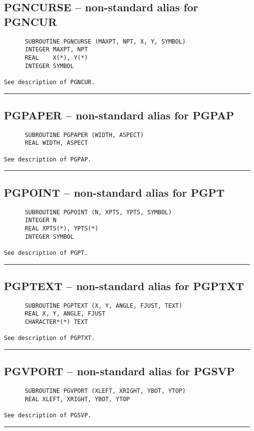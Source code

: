 {\subsection*{PGNCURSE -- non-standard alias for PGNCUR }
\begin{verbatim}
      SUBROUTINE PGNCURSE (MAXPT, NPT, X, Y, SYMBOL)
      INTEGER MAXPT, NPT
      REAL    X(*), Y(*)
      INTEGER SYMBOL

See description of PGNCUR.
\end{verbatim}
\hrule


\subsection*{PGPAPER -- non-standard alias for PGPAP }
\begin{verbatim}
      SUBROUTINE PGPAPER (WIDTH, ASPECT)
      REAL WIDTH, ASPECT

See description of PGPAP.
\end{verbatim}
\hrule


\subsection*{PGPOINT -- non-standard alias for PGPT }
\begin{verbatim}
      SUBROUTINE PGPOINT (N, XPTS, YPTS, SYMBOL)
      INTEGER N
      REAL XPTS(*), YPTS(*)
      INTEGER SYMBOL

See description of PGPT.
\end{verbatim}
\hrule


\subsection*{PGPTEXT -- non-standard alias for PGPTXT }
\begin{verbatim}
      SUBROUTINE PGPTEXT (X, Y, ANGLE, FJUST, TEXT)
      REAL X, Y, ANGLE, FJUST
      CHARACTER*(*) TEXT

See description of PGPTXT.
\end{verbatim}
\hrule


\subsection*{PGVPORT -- non-standard alias for PGSVP }
\begin{verbatim}
      SUBROUTINE PGVPORT (XLEFT, XRIGHT, YBOT, YTOP)
      REAL XLEFT, XRIGHT, YBOT, YTOP

See description of PGSVP.
\end{verbatim}
\hrule


}
